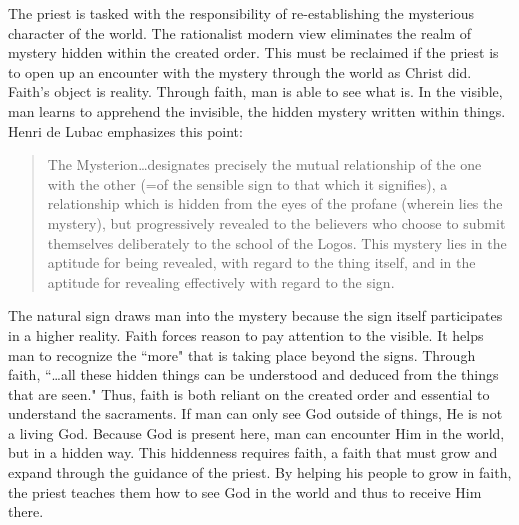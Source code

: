 \documentclass[twoside,10pt]{article}
\begin{document}
The priest is tasked with the responsibility of re-establishing the mysterious character of the world. The rationalist modern view eliminates the realm of mystery hidden within the created order. This must be reclaimed if the priest is to open up an encounter with the mystery through the world as Christ did. Faith’s object is reality. Through faith, man is able to see what is. In the visible, man learns to apprehend the invisible, the hidden mystery written within things. Henri de Lubac emphasizes this point:

\begin{quote}
	The Mysterion…designates precisely the mutual relationship of the one with the other (=of the sensible sign to that which it signifies), a relationship which is hidden from the eyes of the profane (wherein lies the mystery), but progressively revealed to the believers who choose to submit themselves deliberately to the school of the Logos. This mystery lies in the aptitude for being revealed, with regard to the thing itself, and in the aptitude for revealing effectively with regard to the sign.\autocite[52]{lubac}
\end{quote}

The natural sign draws man into the mystery because the sign itself participates in a higher reality. Faith forces reason to pay attention to the visible. It helps man to recognize the ``more" that is taking place beyond the signs. Through faith, ``…all these hidden things can be understood and deduced from the things that are seen."\autocite[221]{origen} Thus, faith is both reliant on the created order and essential to understand the sacraments. If man can only see God outside of things, He is not a living God. Because God is present here, man can encounter Him in the world, but in a hidden way. This hiddenness requires faith, a faith that must grow and expand through the guidance of the priest. By helping his people to grow in faith, the priest teaches them how to see God in the world and thus to receive Him there.
\end{document}
